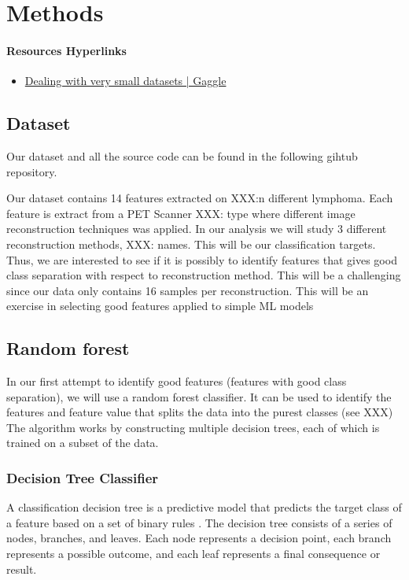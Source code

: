 \section{Methods}
\paragraph{Resources Hyperlinks} 
\begin{itemize}
    \item \href{https://www.kaggle.com/code/rafjaa/dealing-with-very-small-datasets}{Dealing with very small datasets | Gaggle}
    
\end{itemize}


\subsection{Dataset}


Our dataset and all the source code can be found in the following gihtub
repository. 

Our dataset contains 14 features extracted on XXX:n different lymphoma. Each
feature is extract from a PET Scanner XXX: type where different image
reconstruction techniques was applied. In our analysis we will study 3
different reconstruction methods, XXX: names. This will be our classification
targets. Thus, we are interested to see if it is possibly to identify features
that gives good class separation with respect to reconstruction method. This
will be a challenging since our data only contains 16 samples per
reconstruction. This will be an exercise in selecting good features applied to
simple ML models


\subsection{Random forest}
In our first attempt to identify good features (features with good
class separation), we will use a random forest classifier. 
It can be used to identify the features and feature value that splits the data
into the purest classes (see XXX)
The algorithm works by constructing multiple decision trees, each of which is trained 
on a subset of the data. 

\subsubsection{Decision Tree Classifier}
A classification decision tree is a predictive model that predicts the target
class of a feature based on a set of binary rules . The decision tree consists of a series of
nodes, branches, and leaves. Each node represents a decision point, each branch
represents a possible outcome, and each leaf represents a final consequence or
result. 

